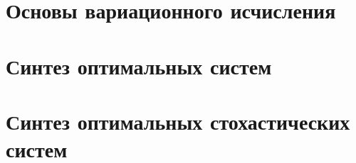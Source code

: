 \documentclass[preprint,russian,a5paper,10pt,twoside]{ncc}
\begin{document}
\clearpage
\section{Основы вариационного исчисления\label{variations}}

\clearpage
\section{Синтез оптимальных систем\label{synthesis}}

\clearpage
\section{Синтез оптимальных стохастических систем\label{stochastic}}
\end{document}
